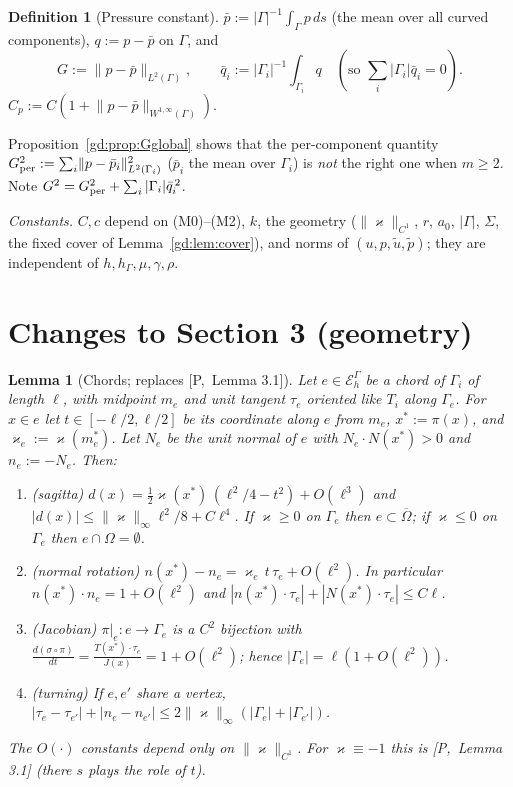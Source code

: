 \documentclass[11pt,reqno]{amsart}
\theoremstyle{plain}
\newtheorem{lemma}[theorem]{Lemma}
\theoremstyle{definition}
\newtheorem{definition}[theorem]{Definition}
\newcommand{\hG}{h_\Gamma}
\newcommand{\EG}{\mathcal E_h^\Gamma}
\newcommand{\ut}{\tilde u}
\newcommand{\pt}{\tilde p}
\newcommand{\pbar}{\bar p}
\newcommand{\norm}[1]{\lVert #1\rVert}
\newcommand{\kap}{\varkappa}            %
\newcommand{\kapi}{\norm{\kap}_\infty}
\newcommand{\Pref}[1]{\textup{[P,~#1]}}
\begin{document}
\begin{definition}[Pressure constant]\label{gd:def:G}
$\pbar:=|\Gamma|^{-1}\int_\Gamma p\,ds$ (the mean over all curved components), $q:=p-\pbar$ on $\Gamma$, and
\[
G:=\norm{p-\pbar}_{L^2(\Gamma)},\qquad \bar q_i:=|\Gamma_i|^{-1}\int_{\Gamma_i}q\quad(\text{so }\textstyle\sum_i|\Gamma_i|\bar q_i=0).
\]
$C_p:=C(1+\norm{p-\pbar}_{W^{1,\infty}(\Gamma)})$.
\end{definition}
Proposition~\ref{gd:prop:Gglobal} shows that the per-component quantity $G_{\rm per}^2:=\sum_i\norm{p-\bar p_i}_{L^2(\Gamma_i)}^2$ ($\bar p_i$ the mean over $\Gamma_i$) is \emph{not} the right one when $m\ge2$. Note $G^2=G_{\rm per}^2+\sum_i|\Gamma_i|\bar q_i^{\,2}$.

\emph{Constants.} $C,c$ depend on (M0)--(M2), $k$, the geometry ($\norm{\kap}_{C^1}$, $r$, $a_0$, $|\Gamma|$, $\Sigma$, the fixed cover of Lemma~\ref{gd:lem:cover}), and norms of $(u,p,\ut,\pt)$; they are independent of $h,\hG,\mu,\gamma,\rho$.

\section{Changes to Section 3 (geometry)}\label{gd:sec:geometry}

\begin{lemma}[Chords; replaces \Pref{Lemma 3.1}]\label{gd:lem:chords}
Let $e\in\EG$ be a chord of $\Gamma_i$ of length $\ell$, with midpoint $m_e$ and unit tangent $\tau_e$ oriented like $T_i$ along $\Gamma_e$. For $x\in e$ let $t\in[-\ell/2,\ell/2]$ be its coordinate along $e$ from $m_e$, $x^\ast:=\pi(x)$, and $\kap_e:=\kap(m_e^\ast)$. Let $N_e$ be the unit normal of $e$ with $N_e\cdot N(x^\ast)>0$ and $n_e:=-N_e$. Then:
\begin{enumerate}[label=(\alph*)]
\item \emph{(sagitta)} $d(x)=\tfrac12\kap(x^\ast)\,(\ell^2/4-t^2)+O(\ell^3)$ and $|d(x)|\le\kapi\ell^2/8+C\ell^4$. If $\kap\ge0$ on $\Gamma_e$ then $e\subset\overline\Omega$; if $\kap\le0$ on $\Gamma_e$ then $e\cap\Omega=\emptyset$.
\item \emph{(normal rotation)} $n(x^\ast)-n_e=\kap_e\,t\,\tau_e+O(\ell^2)$. In particular $n(x^\ast)\cdot n_e=1+O(\ell^2)$ and $|n(x^\ast)\cdot\tau_e|+|N(x^\ast)\cdot\tau_e|\le C\ell$.
\item \emph{(Jacobian)} $\pi|_e:e\to\Gamma_e$ is a $C^2$ bijection with $\frac{d(\sigma\circ\pi)}{dt}=\frac{T(x^\ast)\cdot\tau_e}{J(x)}=1+O(\ell^2)$; hence $|\Gamma_e|=\ell(1+O(\ell^2))$.
\item \emph{(turning)} If $e,e'$ share a vertex, $|\tau_e-\tau_{e'}|+|n_e-n_{e'}|\le2\kapi(|\Gamma_e|+|\Gamma_{e'}|)$.
\end{enumerate}
The $O(\cdot)$ constants depend only on $\norm{\kap}_{C^1}$. For $\kap\equiv-1$ this is \Pref{Lemma 3.1} (there $s$ plays the role of $t$).
\end{lemma}
\end{document}
